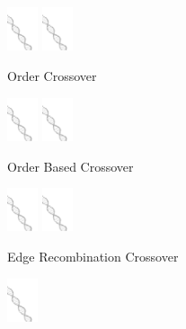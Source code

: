 \begin{figure}
\begin{subfigure}[b]{0.3\textwidth}
		\centering
		\includegraphics[width=0.1\textwidth]{res/cover.png}
		\includegraphics[width=0.1\textwidth]{res/cover.png}
		\caption{Order Crossover}
		\label{fig:z}
    	\end{subfigure}
%
	\begin{subfigure}[b]{0.3\textwidth}
		\centering
		\includegraphics[width=0.1\textwidth]{res/cover.png}
		\includegraphics[width=0.1\textwidth]{res/cover.png}
		\caption{Order Based Crossover}
		\label{fig:x}
    	\end{subfigure}
%
	\begin{subfigure}[b]{0.3\textwidth}
		\centering
		\includegraphics[width=0.1\textwidth]{res/cover.png}
		\includegraphics[width=0.1\textwidth]{res/cover.png}
		\caption{Edge Recombination Crossover}
		\label{fig:y}
    	\end{subfigure}
%
	\begin{subfigure}[b]{0.3\textwidth}
		\centering
		\includegraphics[width=0.1\textwidth]{res/cover.png}

\end{subfigure}
\end{figure}
